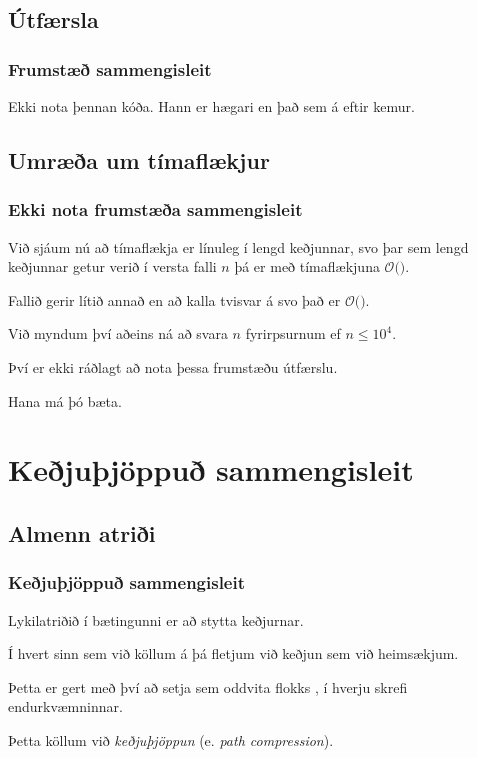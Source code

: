\subsection{Útfærsla}
{
	\frametitle{Frumstæð sammengisleit}
	{
		\item<0|handout:1> { Ekki nota þennan kóða. Hann er hægari en það sem á eftir kemur. }
	}
}

\subsection{Umræða um tímaflækjur}
{
	\frametitle{Ekki nota frumstæða sammengisleit}
	{
		\item<1-> Við sjáum nú að tímaflækja  er línuleg í lengd keðjunnar, svo 
			þar sem lengd keðjunnar getur verið í versta falli $n$ þá er  með tímaflækjuna $\mathcal{O}($\onslide<2->{$\,n\,$}$)$.
		\item<3-> Fallið  gerir lítið annað en að kalla tvisvar á  svo það er $\mathcal{O}($\onslide<4->{$\,n\,$}$)$.
		\item<5-> Við myndum því aðeins ná að svara $n$ fyrirpsurnum ef $n \leq 10^4$.
		\item<6-> Því er ekki ráðlagt að nota þessa frumstæðu útfærslu.
		\item<7-> Hana má þó bæta.
	}
}

\section{Keðjuþjöppuð sammengisleit}
\subsection{Almenn atriði}
{
	\frametitle{Keðjuþjöppuð sammengisleit}
	{
		\item<1-> Lykilatriðið í bætingunni er að stytta keðjurnar.
		\item<2-> Í hvert sinn sem við köllum á  þá fletjum við keðjun sem við heimsækjum.
		\item<3-> Þetta er gert með því að setja  sem oddvita flokks , í hverju skrefi endurkvæmninnar.
		\item<4-> Þetta köllum við \emph{keðjuþjöppun} (e. \emph{path compression}).
	}
}

